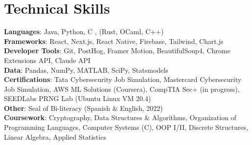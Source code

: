 \documentclass[letterpaper,11pt]{article}
\begin{document}
\section{Technical Skills}
  \begin{itemize}[leftmargin=0.15in, label={}]
    \small{\item{
      \textbf{Languages}{: Java, Python, C , (Rust, OCaml, C++)} \\
      \textbf{Frameworks}{: React, Next.js, React Native, Firebase, Tailwind, Chart.js} \\
      \textbf{Developer Tools}{: Git, PostHog, Framer Motion, BeautifulSoup4, Chrome Extensions API, Claude API} \\
      \textbf{Data}{: Pandas, NumPy, MATLAB, SciPy, Statsmodels}\\
      \textbf{Certifications}{: Tata Cybersecurity Job Simulation, Mastercard Cybersecurity Job Simulation, AWS ML Solutions (Coursera), CompTIA Sec+ (in progress), SEEDLabs PRNG Lab (Ubuntu Linux VM 20.4)}\\
      \textbf{Other}{: Seal of Bi-literacy (Spanish \& English, 2022)}\\
      \textbf{Coursework}{: Cryptography, Data Structures \& Algorithms, Organization of Programming Languages, Computer Systems (C), OOP I/II, Discrete Structures, Linear Algebra, Applied Statistics}
    }}
  \end{itemize}

\end{document}
